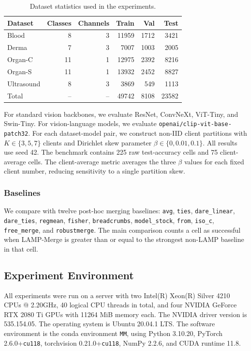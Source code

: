 \begin{table}[t]
\centering
\caption{Dataset statistics used in the experiments.}
\label{tab:dataset-stats}
\scriptsize
\setlength{\tabcolsep}{3.2pt}
\begin{tabular}{lrrrrr}
\toprule
Dataset & Classes & Channels & Train & Val & Test \\
\midrule
Blood & 8 & 3 & 11959 & 1712 & 3421 \\
Derma & 7 & 3 & 7007 & 1003 & 2005 \\
Organ-C & 11 & 1 & 12975 & 2392 & 8216 \\
Organ-S & 11 & 1 & 13932 & 2452 & 8827 \\
Ultrasound & 8 & 3 & 3869 & 549 & 1113 \\
\midrule
Total & -- & -- & 49742 & 8108 & 23582 \\
\bottomrule
\end{tabular}
\end{table}

For standard vision backbones, we evaluate ResNet, ConvNeXt, ViT-Tiny, and Swin-Tiny. For vision-language models, we evaluate \texttt{openai/clip-vit-base-patch32}. For each dataset-model pair, we construct non-IID client partitions with $K\in\{3,5,7\}$ clients and Dirichlet skew parameter $\beta\in\{0,0.01,0.1\}$. All results use seed 42. The benchmark contains 225 raw test-accuracy cells and 75 client-average cells. The client-average metric averages the three $\beta$ values for each fixed client number, reducing sensitivity to a single partition skew.

\subsubsection{Baselines}

We compare with twelve post-hoc merging baselines: \texttt{avg}, \texttt{ties}, \texttt{dare\_linear}, \texttt{dare\_ties}, \texttt{regmean}, \texttt{fisher}, \texttt{breadcrumbs}, \texttt{model\_stock}, \texttt{from}, \texttt{iso\_c}, \texttt{free\_merge}, and \texttt{robustmerge}. The main comparison counts a cell as successful when LAMP-Merge is greater than or equal to the strongest non-LAMP baseline in that cell.

\subsection{Experiment Environment}

All experiments were run on a server with two Intel(R) Xeon(R) Silver 4210 CPUs @ 2.20GHz, 40 logical CPU threads in total, and four NVIDIA GeForce RTX 2080 Ti GPUs with 11264 MiB memory each. The NVIDIA driver version is 535.154.05. The operating system is Ubuntu 20.04.1 LTS. The software environment is the conda environment \texttt{MM}, using Python 3.10.20, PyTorch 2.6.0+\texttt{cu118}, torchvision 0.21.0+\texttt{cu118}, NumPy 2.2.6, and CUDA runtime 11.8.

